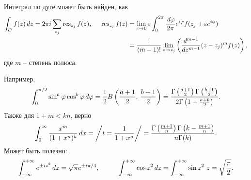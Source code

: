 
Интеграл по дуге может быть найден, как
\begin{align*}
    \int_C f(z) \, d z = 2 \pi i \sum_{z_j} \mathop{\mathrm{res}}\nolimits_{z_j} f(z),
    \hspace{5 mm} 
    \mathop{\mathrm{res}}\nolimits_{z_j} f(z) &= \lim_{\varepsilon \to 0} \varepsilon \int_0^{2\pi} \frac{\, d \varphi}{2\pi} e^{i \varphi} f(z_j + \varepsilon e^{i \varphi}) \\ 
    &= \frac{1}{(m-1)!} \lim_{z \to z_j} \left(
        \frac{d^{m-1} }{d z^{m-1}} (z-z_j)^m f(z)
    \right),
\end{align*}
где $m$ -- степень полюса. 



Например,
\begin{equation*}
    \int_0^{\pi/2} \sin^a \varphi \cos^b \varphi \, d \varphi =  \frac{1}{2} B\left(\frac{a+1}{2},\, \frac{b+1}{2}\right) = \frac{\Gamma\left(\frac{a+1}{2}\right) \Gamma\left(\frac{b+1}{2}\right)}{2 \Gamma\left(1 + \frac{a + b}{2}\right)}.
\end{equation*}
Также для $1 + m < kn$, верно
\begin{equation*}
    \int_{0}^{\infty}  \frac{x^m}{(1+x^n)^k} \, d x = \bigg/
        t = \frac{1}{1+x^n}
    \bigg/ = \frac{\Gamma \left(\frac{m+1}{n}\right) \Gamma \left(k-\frac{m+1}{n}\right)}{n \Gamma (k)}.
\end{equation*}
Может быть полезно:
\begin{equation*}
    \int_{-\infty}^{+\infty} e^{\pm i z^2} \d z = \sqrt{\pi} e^{\pm i \pi / 4},
    \hspace{10 mm} 
    \int_{-\infty}^{+\infty} \cos z^2 \d z = \int_{-\infty}^{+\infty} \sin z^2 \ z = \sqrt{\frac{\pi}{2}}.
\end{equation*}








